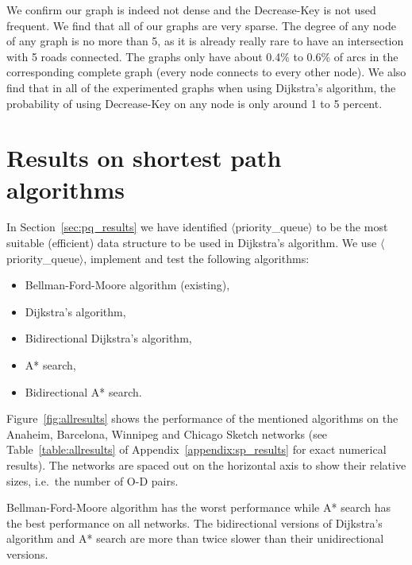 We confirm our graph is indeed not dense and the Decrease-Key is not used frequent.
We find that all of our graphs are very sparse.
The degree of any node of any graph is no more than 5,
as it is already really rare to have an intersection with 5 roads connected.
The graphs only have about 0.4\% to 0.6\% of arcs in the corresponding complete graph (every node connects to every other node).
We also find that in all of the experimented graphs when using Dijkstra's algorithm,
the probability of using Decrease-Key on any node is only around 1 to 5 percent.

\section{Results on shortest path algorithms} \label{sec:allresults}
In Section~\ref{sec:pq_results} we have identified  $\langle$priority\_queue$\rangle$ to be the most suitable (efficient) data structure to be used in Dijkstra's algorithm.
We use $\langle$priority\_queue$\rangle$, implement and test the following algorithms:
\begin{itemize}
        \item Bellman-Ford-Moore algorithm (existing),
        \item Dijkstra's algorithm,
        \item Bidirectional Dijkstra's algorithm,
        \item A* search,
        \item Bidirectional A* search.
\end{itemize}
Figure~\ref{fig:allresults} shows the performance of the mentioned algorithms on the Anaheim, Barcelona, Winnipeg and Chicago Sketch networks
(see Table~\ref{table:allresults} of Appendix~\ref{appendix:sp_results} for exact numerical results).
The networks are spaced out on the horizontal axis to show their relative sizes, i.e.\ the number of O-D pairs.

Bellman-Ford-Moore algorithm has the worst performance while A* search has the best performance on all networks.
The bidirectional versions of Dijkstra's algorithm and A* search are more than twice slower than their unidirectional versions.

